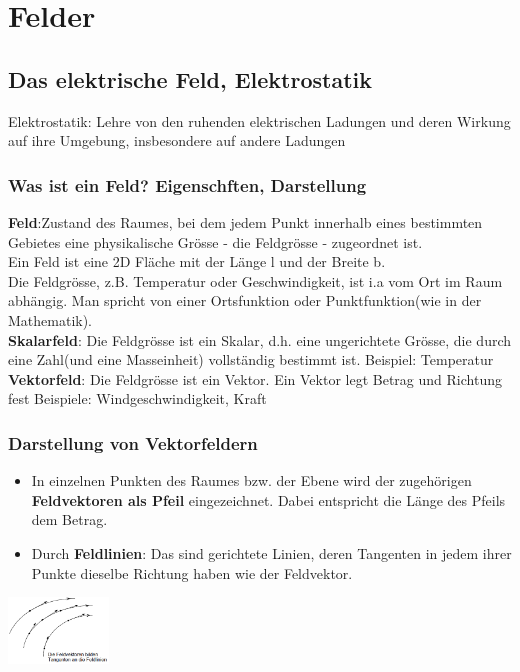 \section{Felder}
\subsection{Das elektrische Feld, Elektrostatik}
Elektrostatik: Lehre von den ruhenden elektrischen Ladungen und deren Wirkung auf ihre Umgebung, insbesondere auf andere Ladungen\\
\subsubsection{Was ist ein Feld? Eigenschften, Darstellung}
\textbf{Feld}:Zustand des Raumes, bei dem jedem Punkt innerhalb eines bestimmten Gebietes eine physikalische Grösse - die Feldgrösse - zugeordnet ist.\\
Ein Feld ist eine 2D Fläche mit der Länge l und der Breite b.\\
Die Feldgrösse, z.B. Temperatur oder Geschwindigkeit, ist i.a vom Ort im Raum abhängig. Man spricht von einer Ortsfunktion oder Punktfunktion(wie in der Mathematik).\\
\textbf{Skalarfeld}: Die Feldgrösse ist ein Skalar, d.h. eine ungerichtete Grösse, die durch eine Zahl(und eine Masseinheit) vollständig bestimmt ist. Beispiel: Temperatur\\

\textbf{Vektorfeld}: Die Feldgrösse ist ein Vektor. Ein Vektor legt Betrag und Richtung fest Beispiele: Windgeschwindigkeit, Kraft\\

\subsubsection{Darstellung von Vektorfeldern}
\begin{multicols}{2}
\begin{itemize}
	\item In einzelnen Punkten des Raumes bzw. der Ebene wird der zugehörigen
	\textbf{Feldvektoren als Pfeil} eingezeichnet. Dabei entspricht die Länge des Pfeils dem Betrag. 
	\item Durch \textbf{Feldlinien}: Das sind gerichtete Linien, deren Tangenten in jedem ihrer Punkte dieselbe Richtung haben wie der Feldvektor.\\
\end{itemize}
\includegraphics[width=0.2\textwidth]{pics/felder/Feldvektoren}
\end{multicols}
